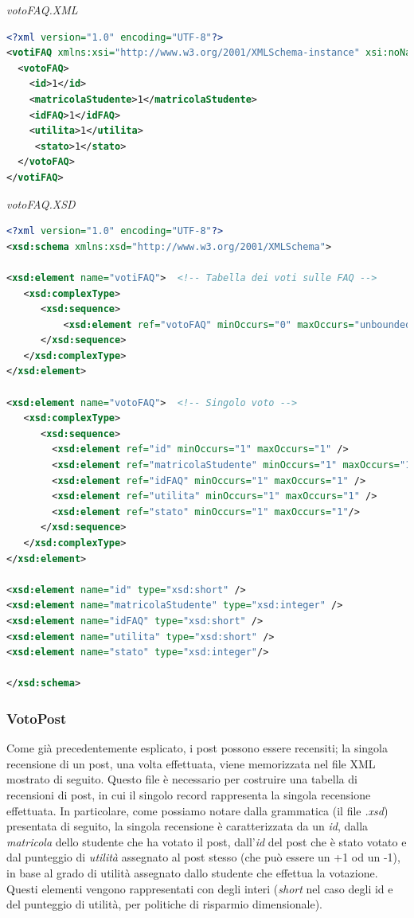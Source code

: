 \documentclass [a4paper,11pt]{book}
\begin{document}
\medskip

\emph{votoFAQ.XML}

\label{sec:votoFAQ}

\begin{lstlisting}[language=XML]
<?xml version="1.0" encoding="UTF-8"?>
<votiFAQ xmlns:xsi="http://www.w3.org/2001/XMLSchema-instance" xsi:noNamespaceSchemaLocation="votoFAQ.xsd">
  <votoFAQ>
    <id>1</id>
    <matricolaStudente>1</matricolaStudente>
    <idFAQ>1</idFAQ>
    <utilita>1</utilita>
	 <stato>1</stato>
  </votoFAQ>
</votiFAQ>
\end{lstlisting}

\emph{votoFAQ.XSD}

\begin{lstlisting}[language=XML]
<?xml version="1.0" encoding="UTF-8"?>
<xsd:schema xmlns:xsd="http://www.w3.org/2001/XMLSchema">

<xsd:element name="votiFAQ">  <!-- Tabella dei voti sulle FAQ -->
   <xsd:complexType> 
      <xsd:sequence>
	      <xsd:element ref="votoFAQ" minOccurs="0" maxOccurs="unbounded" />
      </xsd:sequence>
   </xsd:complexType>
</xsd:element>

<xsd:element name="votoFAQ">  <!-- Singolo voto -->
   <xsd:complexType> 
      <xsd:sequence>
        <xsd:element ref="id" minOccurs="1" maxOccurs="1" /> 
        <xsd:element ref="matricolaStudente" minOccurs="1" maxOccurs="1" />
        <xsd:element ref="idFAQ" minOccurs="1" maxOccurs="1" /> 
        <xsd:element ref="utilita" minOccurs="1" maxOccurs="1" /> 
        <xsd:element ref="stato" minOccurs="1" maxOccurs="1"/>
      </xsd:sequence>
   </xsd:complexType>
</xsd:element>

<xsd:element name="id" type="xsd:short" />
<xsd:element name="matricolaStudente" type="xsd:integer" />
<xsd:element name="idFAQ" type="xsd:short" />
<xsd:element name="utilita" type="xsd:short" />
<xsd:element name="stato" type="xsd:integer"/>

</xsd:schema>
\end{lstlisting}

\medskip

\subsubsection{VotoPost}

Come già precedentemente esplicato, i post possono essere recensiti; la singola recensione di un post, una volta effettuata, viene memorizzata nel file XML mostrato di seguito. Questo file è necessario per costruire una tabella di recensioni di post, in cui il singolo record rappresenta la singola recensione effettuata. In particolare, come possiamo notare dalla grammatica (il file \emph{.xsd}) presentata di seguito, la singola recensione è caratterizzata da un \emph{id}, dalla \emph{matricola} dello studente che ha votato il post, dall'\emph{id} del post che è stato votato e dal punteggio di \emph{utilità} assegnato al post stesso (che può essere un +1 od un -1), in base al grado di utilità assegnato dallo studente che effettua la votazione. Questi elementi vengono rappresentati con degli interi (\emph{short} nel caso degli id e del punteggio di utilità, per politiche di risparmio dimensionale).
\end{document}
